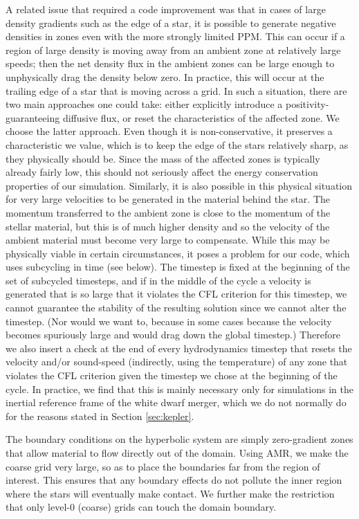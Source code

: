 \documentclass[12pt,preprint]{aastex}
\begin{document}
A related issue that required a code improvement was that in cases of large density gradients such as the edge of a star, it is possible to generate negative densities in zones even with the more strongly limited PPM. This can occur if a region of large density is moving away from an ambient zone at relatively large speeds; then the net density flux in the ambient zones can be large enough to unphysically drag the density below zero. In practice, this will occur at the trailing edge of a star that is moving across a grid. In such a situation, there are two main approaches one could take: either explicitly introduce a positivity-guaranteeing diffusive flux, or reset the characteristics of the affected zone. We choose the latter approach. Even though it is non-conservative, it preserves a characteristic we value, which is to keep the edge of the stars relatively sharp, as they physically should be. Since the mass of the affected zones is typically already fairly low, this should not seriously affect the energy conservation properties of our simulation. Similarly, it is also possible in this physical situation for very large velocities to be generated in the material behind the star. The momentum transferred to the ambient zone is close to the momentum of the stellar material, but this is of much higher density and so the velocity of the ambient material must become very large to compensate. While this may be physically viable in certain circumstances, it poses a problem for our code, which uses subcycling in time (see below). The timestep is fixed at the beginning of the set of subcycled timesteps, and if in the middle of the cycle a velocity is generated that is so large that it violates the CFL criterion for this timestep, we cannot guarantee the stability of the resulting solution since we cannot alter the timestep. (Nor would we want to, because in some cases because the velocity becomes spuriously large and would drag down the global timestep.) Therefore we also insert a check at the end of every hydrodynamics timestep that resets the velocity and/or sound-speed (indirectly, using the temperature) of any zone that violates the CFL criterion given the timestep we chose at the beginning of the cycle. In practice, we find that this is mainly necessary only for simulations in the inertial reference frame of the white dwarf merger, which we do not normally do for the reasons stated in Section \ref{sec:kepler}.

The boundary conditions on the hyperbolic system are simply zero-gradient zones that allow material to flow directly out of the domain. Using AMR, we make the coarse grid very large, so as
to place the boundaries far from the region of interest. This ensures that any boundary effects do not pollute the inner region where the stars will eventually make contact.  We further
make the restriction that only level-0 (coarse) grids can touch the domain boundary.
\end{document}

